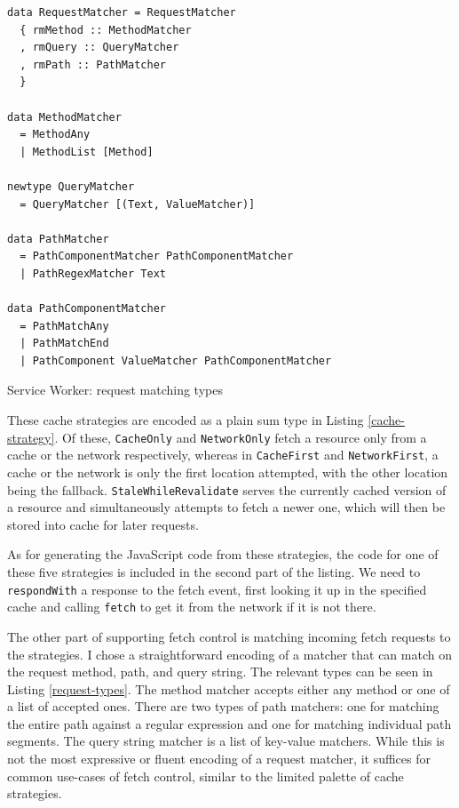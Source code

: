 \documentclass[english,zadani,odsaz]{fitthesis}
\begin{document}
\begin{listing}[!t]
\begin{verbatim}
data RequestMatcher = RequestMatcher
  { rmMethod :: MethodMatcher
  , rmQuery :: QueryMatcher
  , rmPath :: PathMatcher
  }

data MethodMatcher
  = MethodAny
  | MethodList [Method]

newtype QueryMatcher
  = QueryMatcher [(Text, ValueMatcher)]

data PathMatcher
  = PathComponentMatcher PathComponentMatcher
  | PathRegexMatcher Text

data PathComponentMatcher
  = PathMatchAny
  | PathMatchEnd
  | PathComponent ValueMatcher PathComponentMatcher
\end{verbatim}
\caption{Service Worker: request matching types \label{request-types}}
\end{listing}

These cache strategies are encoded as a plain sum type in Listing
\ref{cache-strategy}. Of these, \texttt{CacheOnly} and \texttt{NetworkOnly} fetch a resource only
from a cache or the network respectively, whereas in \texttt{CacheFirst} and
\texttt{NetworkFirst}, a cache or the network is only the first location attempted, with
the other location being the fallback. \texttt{StaleWhileRevalidate} serves the currently
cached version of a resource and simultaneously attempts to fetch a newer one,
which will then be stored into cache for later requests.

As for generating the JavaScript code from these strategies, the code for one of
these five strategies is included in the second part of the listing. We need to
\texttt{respondWith} a response to the fetch event, first looking it up in the specified
cache and calling \texttt{fetch} to get it from the network if it is not there.

The other part of supporting fetch control is matching incoming fetch requests
to the strategies. I chose a straightforward encoding of a matcher that can
match on the request method, path, and query string. The relevant types can be
seen in Listing \ref{request-types}. The method matcher accepts either any method
or one of a list of accepted ones. There are two types of path matchers: one for
matching the entire path against a regular expression and one for matching
individual path segments. The query string matcher is a list of key-value
matchers. While this is not the most expressive or fluent encoding of a request
matcher, it suffices for common use-cases of fetch control, similar to the
limited palette of cache strategies.
\end{document}

